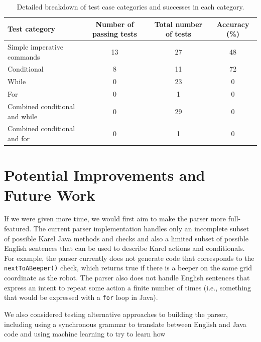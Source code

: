 \documentclass[11pt]{article}
\begin{document}
\begin{table}[ht]
\centering
    \begin{tabular}{lccc}
    \toprule
    Test category & \multicolumn{1}{p{2cm}}{\centering Number of passing tests} & \multicolumn{1}{p{3cm}}{\centering Total number of tests} & \multicolumn{1}{p{2cm}}{\centering Accuracy (\%)}\\ \midrule
    Simple imperative commands & 13 & 27 & 48 \\
    Conditional & 8 & 11 & 72 \\
    While & 0 & 23 & 0 \\
    For & 0 & 1 & 0 \\
    Combined conditional and while & 0 & 29 & 0 \\
    Combined conditional and for & 0 & 1 & 0 \\
    \bottomrule
    \end{tabular}
\caption{Detailed breakdown of test case categories and successes in each category.}
\label{tab:results-breakdown}
\end{table}


\section{Potential Improvements and Future Work}
If we were given more time, we would first aim to make the parser more full-featured. The current
parser implementation handles only an incomplete subset of possible Karel Java methods and checks
and also a limited subset of possible English sentences that can be used to describe Karel actions
and conditionals. For example, the parser currently does not generate code that corresponds to the
\texttt{nextToABeeper()} check, which returns true if there is a beeper on the same grid coordinate
as the robot. The parser also does not handle English sentences that express an intent to repeat
some action a finite number of times (i.e., something that would be expressed with a \texttt{for}
loop in Java).

We also considered testing alternative approaches to building the parser, including using a
synchronous grammar to translate between English and Java code and using machine learning to try to
learn how


%
%



\appendix
\end{document}

